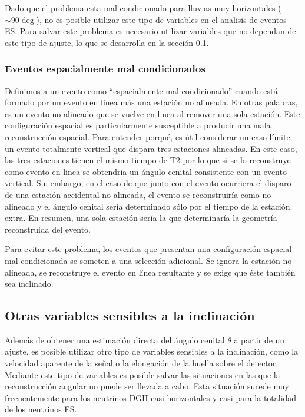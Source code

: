 	Dado que el problema esta mal condicionado para lluvias muy horizontales ($\sim90\deg$), no es posible utilizar este tipo de variables en el analisis de eventos ES.
	Para salvar este problema es necesario utilizar variables que no dependan de este tipo de ajuste, lo que se desarrolla en la sección \ref{sc:otrasVarIncl}.
	
	\subsubsection{Eventos espacialmente mal condicionados}
	\label{sub:illEvents}
	Definimos a un evento como ``espacialmente mal condicionado'' cuando está formado por un evento en linea más una estación no alineada. En otras palabras, es un evento no alineado que se vuelve en linea al remover una sola estación.
	Este configuración espacial es particularmente susceptible a producir una mala reconstrucción espacial. Para entender porqué, es útil considerar un caso límite: un evento totalmente vertical que dispara tres estaciones alineadas. En este caso, las tres estaciones tienen el mismo tiempo de T2 por lo que si se lo reconstruye como evento en linea se obtendría un ángulo cenital consistente con un evento vertical. Sin embargo, en el caso de que junto con el evento ocurriera el disparo de una estación accidental no alineada, el evento se reconstruiría como no alineado y el ángulo cenital sería determinado sólo por el tiempo de la estación extra. En resumen, una sola estación sería la que determinaría la geometría reconstruida del evento.

	Para evitar este problema, los eventos que presentan una configuración espacial mal condicionada se someten a una selección adicional. 
	Se ignora la estación no alineada, se reconstruye el evento en línea resultante y se exige que éste también sea inclinado.
	
	
	\subsection{Otras variables sensibles a la inclinación}
	\label{sc:otrasVarIncl}
	
	
	Además de obtener una estimación directa del ángulo cenital $\theta$ a partir de un ajuste, es posible utilizar otro tipo de variables sensibles a la inclinación, como la velocidad aparente de la señal o la elongación de la huella sobre el detector.
	Mediante este tipo de variables es posible salvar las situaciones en las que la reconstrucción angular no puede ser llevada a cabo.
	Esta situación sucede muy frecuentemente para los neutrinos DGH casi horizontales y casi para la totalidad de los neutrinos ES.
	
